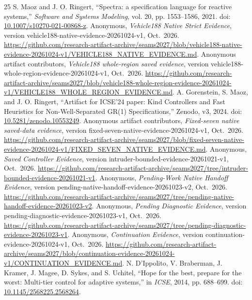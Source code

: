\begin{thebibliography}{25}
S. Maoz and J. O. Ringert, ``Spectra: a specification language for reactive systems,'' \emph{Software and Systems Modeling}, vol. 20, pp. 1553--1586, 2021. doi: \href{https://doi.org/10.1007/s10270-021-00868-z}{10.1007/s10270-021-00868-z}.
Anonymous, \emph{Vehicle188 Native Strict Evidence}, version vehicle188-native-evidence-20261024-v1, Oct.~2026. \url{https://github.com/research-artifact-archive/seams2027/blob/vehicle188-native-evidence-20261024-v1/VEHICLE188_NATIVE_EVIDENCE.md}.
Anonymous artifact contributors, \emph{Vehicle188 whole-region saved evidence}, version vehicle188-whole-region-evidence-20261024-v1, Oct.~2026. \url{https://github.com/research-artifact-archive/seams2027/blob/vehicle188-whole-region-evidence-20261024-v1/VEHICLE188_WHOLE_REGION_EVIDENCE.md}.
A. Gorenstein, S. Maoz, and J. O. Ringert, ``Artifact for ICSE'24 paper: Kind Controllers and Fast Heuristics for Non-Well-Separated GR(1) Specifications,'' Zenodo, v3, 2024. doi: \href{https://doi.org/10.5281/zenodo.10553249}{10.5281/zenodo.10553249}.
Anonymous artifact contributors, \emph{Fixed-seven native saved-data evidence}, version fixed-seven-native-evidence-20261024-v1, Oct.~2026. \url{https://github.com/research-artifact-archive/seams2027/blob/fixed-seven-native-evidence-20261024-v1/FIXED_SEVEN_NATIVE_EVIDENCE.md}.
Anonymous, \emph{Saved Controller Evidence}, version intruder-bounded-evidence-20261021-v1, Oct.~2026. \url{https://github.com/research-artifact-archive/seams2027/tree/intruder-bounded-evidence-20261021-v1}.
Anonymous, \emph{Pending-Work Native Handoff Evidence}, version pending-native-handoff-evidence-20261023-v2, Oct.~2026. \url{https://github.com/research-artifact-archive/seams2027/tree/pending-native-handoff-evidence-20261023-v2}.
Anonymous, \emph{Pending Diagnostic Evidence}, version pending-diagnostic-evidence-20261023-v1, Oct.~2026. \url{https://github.com/research-artifact-archive/seams2027/tree/pending-diagnostic-evidence-20261023-v1}.
Anonymous, \emph{Continuation Evidence}, version continuation-evidence-20261024-v1, Oct.~2026. \url{https://github.com/research-artifact-archive/seams2027/blob/continuation-evidence-20261024-v1/CONTINUATION_EVIDENCE.md}.
N. D'Ippolito, V. Braberman, J. Kramer, J. Magee, D. Sykes, and S. Uchitel, ``Hope for the best, prepare for the worst: Multi-tier control for adaptive systems,'' in \emph{ICSE}, 2014, pp. 688--699. doi: \href{https://doi.org/10.1145/2568225.2568264}{10.1145/2568225.2568264}.

\end{thebibliography}
